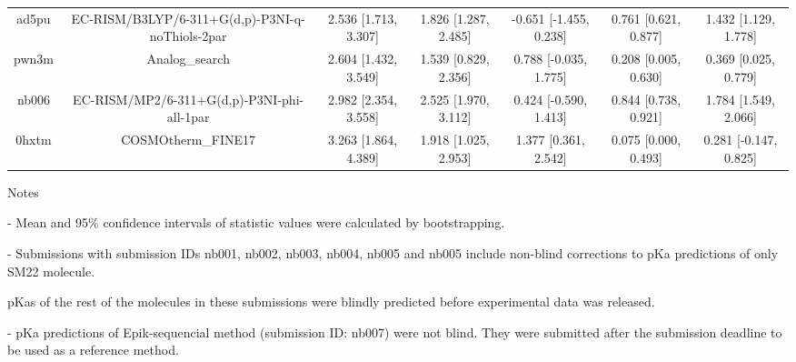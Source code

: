 \documentclass{article}
\begin{document}
\begin{center}
\begin{longtable}{|ccccccc|}
 ad5pu &    EC-RISM/B3LYP/6-311+G(d,p)-P3NI-q-noThiols-2par &  2.536 [1.713, 3.307] &  1.826 [1.287, 2.485] &   -0.651 [-1.455, 0.238] &  0.761 [0.621, 0.877] &   1.432 [1.129, 1.778] \\
 pwn3m &                                     Analog\_search &  2.604 [1.432, 3.549] &  1.539 [0.829, 2.356] &    0.788 [-0.035, 1.775] &  0.208 [0.005, 0.630] &   0.369 [0.025, 0.779] \\
 nb006 &         EC-RISM/MP2/6-311+G(d,p)-P3NI-phi-all-1par &  2.982 [2.354, 3.558] &  2.525 [1.970, 3.112] &    0.424 [-0.590, 1.413] &  0.844 [0.738, 0.921] &   1.784 [1.549, 2.066] \\
 0hxtm &                                 COSMOtherm\_FINE17 &  3.263 [1.864, 4.389] &  1.918 [1.025, 2.953] &     1.377 [0.361, 2.542] &  0.075 [0.000, 0.493] &  0.281 [-0.147, 0.825] \\
\end{longtable}
\end{center}

Notes

- Mean and 95\% confidence intervals of statistic values were calculated by bootstrapping.

- Submissions with submission IDs nb001, nb002, nb003, nb004, nb005 and nb005 include non-blind corrections to pKa predictions of only SM22 molecule.

pKas of the rest of the molecules in these submissions were blindly predicted before experimental data was released.

- pKa predictions of Epik-sequencial method (submission ID: nb007) were not blind. They were submitted after the submission deadline to be used as a reference method.
\end{document}
